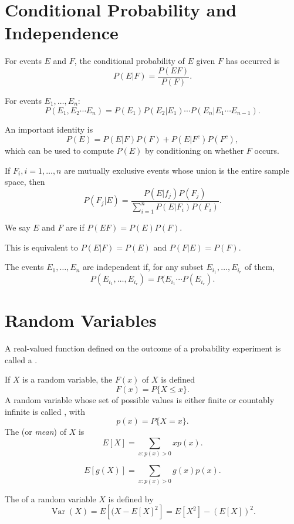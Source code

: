 \documentclass{article}
\DeclareMathOperator{\Var}{\textrm{Var}}
\begin{document}
\section{Conditional Probability and Independence}
\begin{definition}
For events $E$ and $F$, the conditional probability of $E$ given $F$ has occurred is 
\[P(E|F)=\frac{P(EF)}{P(F)}.\]
\end{definition}
\begin{theorem}
For events $E_{1},\dotsc,E_{n}$:
    \[P(E_{1},E_{2}\dotsi E_{n})=P(E_{1})P(E_{2}|E_{1})\dotsi P(E_{n}|E_{1}\dotsi E_{n-1}).\]
\end{theorem}
\begin{remark}
    An important identity is
    \[P(E)=P(E|F)P(F)+P(E|F^{c})P(F^{c}),\]
    which can be used to compute $P(E)$ by conditioning on whether $F$ occurs.
\end{remark}
\begin{theorem}
    If $F_{i},i=1,\dotsc,n$ are mutually exclusive events whose union is the entire sample space, then
    \[P(F_{j}|E)=\frac{P(E|f_{j})P(F_{j})}{\sum_{i=1}^{n}P(E|F_{i})P(F_{i})}.\]
\end{theorem}
\begin{definition}
    We say $E$ and $F$ are  if $P(EF)=P(E)P(F)$.
\end{definition}
\begin{remark}
    This is equivalent to $P(E|F)=P(E)$ and $P(F|E)=P(F)$.
\end{remark}
The events $E_{1},\dotsc,E_{n}$ are independent if, for any subset $E_{i_{1}},\dotsc,E_{i_{r}}$ of them,
\[P(E_{i_{1}},\dotsc,E_{i_{r}})=P(E_{i_{1}}\dotsi P(E_{i_{r}}).\]
\section{Random Variables}
\begin{definition}
    A real-valued function defined on the outcome of a probability experiment is called a . 
    
    If $X$ is a random variable, the  $F(x)$ of $X$ is defined 
    \[F(x)=P\{X\leq x\}.\]
    A random variable whose set of possible values is either finite or countably infinite is called , with 
    \[p(x)=P\{X=x\}.\]The  (or \textit{mean}) of $X$ is 
    \[E[X]=\sum_{x:p(x)>0}xp(x).\]

\end{definition}
\begin{theorem}
    \[E[g(X)]=\sum_{x:p(x)>0}g(x)p(x).\]
\end{theorem}
\begin{definition}
    The  of a random variable $X$ is defined by 
    \[\Var(X)=E[(X-E[X]^{2}]=E[X^{2}]-(E[X])^{2}.\]
\end{definition}
\end{document}
